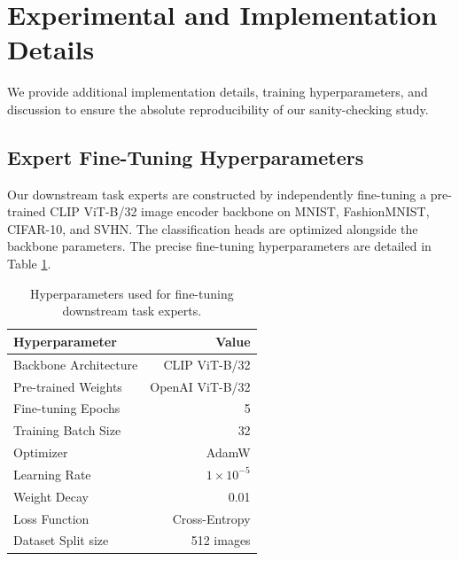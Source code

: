 \documentclass{article}
\theoremstyle{plain}
\theoremstyle{definition}
\theoremstyle{remark}
\begin{document}










\newpage
\appendix
\onecolumn
\section{Experimental and Implementation Details}
\label{sec:appendix_details}

We provide additional implementation details, training hyperparameters, and discussion to ensure the absolute reproducibility of our sanity-checking study.

\subsection{Expert Fine-Tuning Hyperparameters}
Our downstream task experts are constructed by independently fine-tuning a pre-trained CLIP ViT-B/32 image encoder backbone on MNIST, FashionMNIST, CIFAR-10, and SVHN. The classification heads are optimized alongside the backbone parameters. The precise fine-tuning hyperparameters are detailed in Table \ref{tab:hyperparams}.

\begin{table}[h]
\caption{Hyperparameters used for fine-tuning downstream task experts.}
\label{tab:hyperparams}
\centering
\begin{tabular}{lr}
\toprule
\textbf{Hyperparameter} & \textbf{Value} \\
\midrule
Backbone Architecture & CLIP ViT-B/32 \\
Pre-trained Weights & OpenAI ViT-B/32 \\
Fine-tuning Epochs & 5 \\
Training Batch Size & 32 \\
Optimizer & AdamW \\
Learning Rate & $1 \times 10^{-5}$ \\
Weight Decay & 0.01 \\
Loss Function & Cross-Entropy \\
Dataset Split size & 512 images \\
\bottomrule
\end{tabular}
\end{table}
\end{document}
